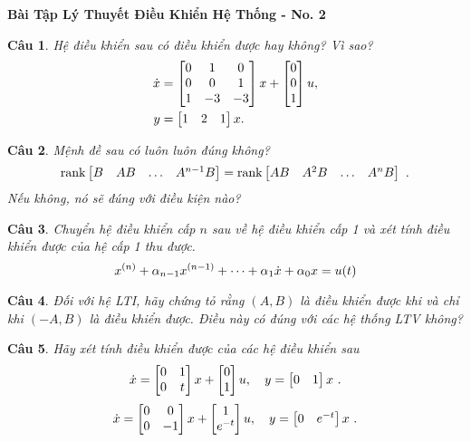 \documentclass[11pt]{article}
\newtheorem{bt}{Câu}
\begin{document}



\begin{center}
	{\bf Bài Tập Lý Thuyết Điều Khiển Hệ Thống - No. 2}
\end{center}

\begin{bt}
Hệ điều khiển sau có điều khiển được hay không? Vì sao?
%
\begin{align}
	\dot{x} &= \begin{bmatrix} 0 & 1 & 0 \\ 0 & 0 & 1 \\ 1 & -3 & -3 \end{bmatrix} x + \begin{bmatrix} 0 \\ 0 \\ 1 \end{bmatrix} u, \\
	y &= \begin{bmatrix} 1 & 2 & 1 \end{bmatrix} x. 
\end{align}
%
\end{bt}

\begin{bt}
Mệnh đề sau có luôn luôn đúng không?
%
\[
\rank \m{B & A B & \dots & A^{n-1}B} = \rank \m{AB & A^2 B & \dots & A^{n} B} \ .
\]
% 
Nếu không, nó sẽ đúng với điều kiện nào?
\end{bt}

\begin{bt}
Chuyển hệ điều khiển cấp $n$ sau về hệ điều khiển cấp 1 và xét tính điều khiển được của hệ cấp 1 thu được.
%
\begin{equation}
	x^{(n)} + \alpha_{n-1} x^{(n-1)} + \dots + \alpha_1 \dot{x} + \alpha_0 x = u(t) 
\end{equation}
%
\end{bt}


\begin{bt}
Đối với hệ LTI, hãy chứng tỏ rằng $(A, B)$ là điều khiển được khi và chỉ khi $(-A, B)$ là điều khiển được. Điều này có đúng với các hệ thống LTV không?
\end{bt}   

\begin{bt}
Hãy xét tính điều khiển được của các hệ điều khiển sau
%
\begin{equation}\label{1}
\dot{x} = \begin{bmatrix} 0 & 1 \\ 0 & t \end{bmatrix} x + \begin{bmatrix} 0 \\ 1 \end{bmatrix} u, \quad y = \begin{bmatrix} 0 & 1 \end{bmatrix} x \ .
\end{equation}
%
\begin{equation}\label{2}
	\dot{x} = \begin{bmatrix} 0 & 0 \\ 0 & -1 \end{bmatrix} x + \begin{bmatrix} 1 \\ e^{-t} \end{bmatrix} u, \quad y = \begin{bmatrix} 0 & e^{-t} \end{bmatrix} x \ .
\end{equation}
%

\end{bt}
	
	
\end{document}

